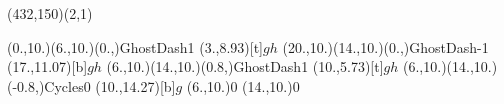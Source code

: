 \unitlength=1bp%

\begin{feynartspicture}(432,150)(2,1)

\FADiagram{}
\FAProp(0.,10.)(6.,10.)(0.,){GhostDash}{1}
\FALabel(3.,8.93)[t]{$gh$}
\FAProp(20.,10.)(14.,10.)(0.,){GhostDash}{-1}
\FALabel(17.,11.07)[b]{$gh$}
\FAProp(6.,10.)(14.,10.)(0.8,){GhostDash}{1}
\FALabel(10.,5.73)[t]{$gh$}
\FAProp(6.,10.)(14.,10.)(-0.8,){Cycles}{0}
\FALabel(10.,14.27)[b]{$g$}
\FAVert(6.,10.){0}
\FAVert(14.,10.){0}

\FADiagram{}
\end{feynartspicture}

